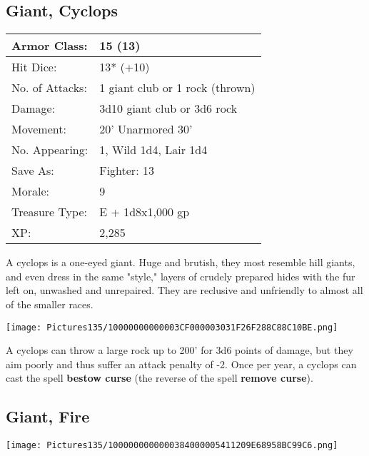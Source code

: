 \documentclass[a4paper,twoside,openany,10pt]{book}
\begin{document}
\begin{multicols}{2}
\subsection*{Giant, Cyclops}\label{giant-cyclops}

\begin{tabularx}{0.48\textwidth}{@{}lX@{}}
Armor Class: & 15 (13) \\\hline
Hit Dice: & 13* (+10) \\\hline
No. of Attacks: & 1 giant club or 1 rock (thrown) \\\hline
Damage: & 3d10 giant club or 3d6 rock \\\hline
Movement: & 20' Unarmored 30' \\\hline
No. Appearing: & 1, Wild 1d4, Lair 1d4 \\\hline
Save As: & Fighter: 13 \\\hline
Morale: & 9 \\\hline
Treasure Type: & E + 1d8x1,000 gp \\\hline
XP: & 2,285 \\\hline
\end{tabularx}\medskip

A cyclops is a one-eyed giant. Huge and brutish, they most resemble hill giants, and even dress in the same "style," layers of crudely prepared hides with the fur left on, unwashed and unrepaired. They are reclusive and unfriendly to almost all of the smaller races.

\begin{center}
	\texttt{[image: Pictures135/10000000000003CF000003031F26F288C88C10BE.png]}
\end{center}


A cyclops can throw a large rock up to 200' for 3d6 points of damage, but they aim poorly and thus suffer an attack penalty of -2. Once per year, a cyclops can cast the spell \textbf{bestow curse} (the reverse of the spell \textbf{remove curse}).


\subsection*{Giant, Fire}\label{giant-fire}


\texttt{[image: Pictures135/1000000000000384000005411209E68958BC99C6.png]}



\end{multicols}
\end{document}
